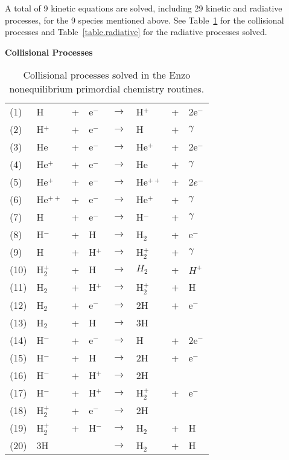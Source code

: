 A total of 9 kinetic equations are solved, including 29 kinetic and radiative 
processes, for the 9 species mentioned above.  See Table~\ref{table.collisional} 
for the collisional processes and Table~\ref{table.radiative} for the 
radiative processes solved.


\begin{table}
\begin{center}
{\bfseries Collisional Processes}\\[1ex]
\begin{tabular}{llllllll}
(1) & H & + & e$^-$ & $\rightarrow$ & H$^+$ &+& 2e$^-$ \\
(2) & H$^+$ &+ &e$^-$ & $\rightarrow$ & H &+ &$\gamma$ \\
(3) & He &+& e$^-$ & $\rightarrow$ & He$^+$ &+& 2e$^-$  \\
(4) & He$^+$ &+& e$^-$ & $\rightarrow$ & He &+ &$\gamma$  \\
(5) & He$^{+}$ &+& e$^-$ & $\rightarrow$ & He$^{++}$ &+& 2$e^-$  \\
(6) & He$^{++}$ &+& e$^-$ & $\rightarrow$ & He$^+$ &+& $\gamma$ \\
(7) & H &+& e$^-$ &$\rightarrow$& H$^-$ &+& $\gamma$  \\
(8) & H$^-$ &+& H &$\rightarrow$ & H$_2$ & +& e$^-$ \\
(9) & H &+ &H$^+$ &$\rightarrow$ &H$_2^+$ &+ &$\gamma$ \\
(10) & H$_2^+$ &+ &H &$\rightarrow$ &$H_2$ &+ &$H^+$ \\
(11) & H$_2$ &+ &H$^+$ &$\rightarrow$ &H$_2^+$ & +& H \\
(12) & H$_2$ &+ &e$^-$ & $\rightarrow$ & 2H & + & e$^-$  \\
(13) & H$_2$ & + & H & $\rightarrow$ & 3H &   &      \\
(14) & H$^-$ & + & e$^-$ & $\rightarrow$ & H & + & 2e$^-$ \\
(15) & H$^-$ & + & H & $\rightarrow$ & 2H & + & e$^-$ \\ 
(16) & H$^-$ & + & H$^+$ & $\rightarrow$ & 2H & & \\
(17) & H$^-$ & + & H$^+$ & $\rightarrow$ & H$_2^+$ & + & e$^-$ \\
(18) & H$_2^+$ & + & e$^-$ & $\rightarrow$ & 2H & & \\
(19) & H$_2^+$ & + & H$^-$ & $\rightarrow$ & H$_2$ & + & H  \\
(20) & 3H & & & $\rightarrow$ & H$_2$ & + & H
\end{tabular}
\caption[]{Collisional processes solved in the Enzo nonequilibrium
primordial chemistry routines.}
\label{table.collisional}
\end{center}
\end{table}



